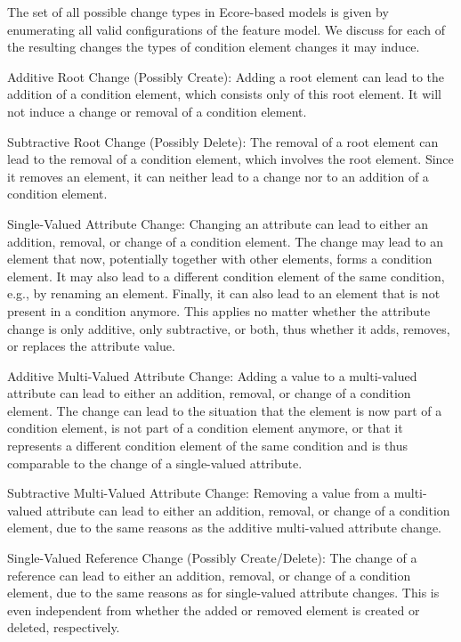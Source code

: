 The set of all possible change types in Ecore-based models is given by enumerating all valid configurations of the feature model.
We discuss for each of the resulting changes the types of condition element changes it may induce.
\begin{properdescription}
    \item[Additive Root Change (Possibly Create):] Adding a root element can lead to the addition of a condition element, which consists only of this root element. It will not induce a change or removal of a condition element.
    \item[Subtractive Root Change (Possibly Delete):] The removal of a root element can lead to the removal of a condition element, which involves the root element. Since it removes an element, it can neither lead to a change nor to an addition of a condition element.
    \item[Single-Valued Attribute Change:] Changing an attribute can lead to either an addition, removal, or change of a condition element. The change may lead to an element that now, potentially together with other elements, forms a condition element. It may also lead to a different condition element of the same condition, e.g., by renaming an element. Finally, it can also lead to an element that is not present in a condition anymore. This applies no matter whether the attribute change is only additive, only subtractive, or both, thus whether it adds, removes, or replaces the attribute value.
    \item[Additive Multi-Valued Attribute Change:] Adding a value to a multi-valued attribute can lead to either an addition, removal, or change of a condition element. The change can lead to the situation that the element is now part of a condition element, is not part of a condition element anymore, or that it represents a different condition element of the same condition and is thus comparable to the change of a single-valued attribute.
    \item[Subtractive Multi-Valued Attribute Change:] Removing a value from a multi-valued attribute can lead to either an addition, removal, or change of a condition element, due to the same reasons as the additive multi-valued attribute change.
    \item[Single-Valued Reference Change (Possibly Create/Delete):] The change of a reference can lead to either an addition, removal, or change of a condition element, due to the same reasons as for single-valued attribute changes. This is even independent from whether the added or removed element is created or deleted, respectively.

\end{properdescription}
